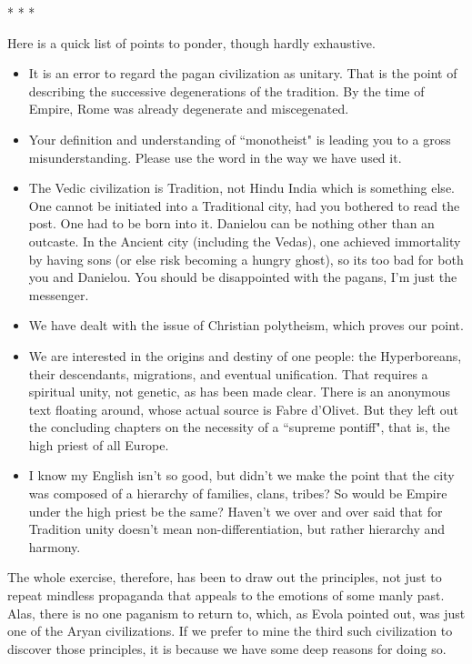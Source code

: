 \begin{center}* * *\end{center}

\begin{footnotesize}\begin{sffamily}



Here is a quick list of points to ponder, though hardly exhaustive.

\begin{itemize}
\item It is an error to regard the pagan civilization as unitary. That is the point of describing the successive degenerations of the tradition. By the time of Empire, Rome was already degenerate and miscegenated. 
\item Your definition and understanding of ``monotheist" is leading you to a gross misunderstanding. Please use the word in the way we have used it. 
\item The Vedic civilization is Tradition, not Hindu India which is something else. One cannot be initiated into a Traditional city, had you bothered to read the post. One had to be born into it. Danielou can be nothing other than an outcaste. In the Ancient city (including the Vedas), one achieved immortality by having sons (or else risk becoming a hungry ghost), so its too bad for both you and Danielou. You should be disappointed with the pagans, I'm just the messenger. 
\item We have dealt with the issue of Christian polytheism, which proves our point. 
\item We are interested in the origins and destiny of one people: the Hyperboreans, their descendants, migrations, and eventual unification. That requires a spiritual unity, not genetic, as has been made clear. There is an anonymous text floating around, whose actual source is Fabre d'Olivet. But they left out the concluding chapters on the necessity of a ``supreme pontiff", that is, the high priest of all Europe. 
\item I know my English isn't so good, but didn't we make the point that the city was composed of a hierarchy of families, clans, tribes? So would be Empire under the high priest be the same? Haven't we over and over said that for Tradition unity doesn't mean non-differentiation, but rather hierarchy and harmony. 
\end{itemize}
The whole exercise, therefore, has been to draw out the principles, not just to repeat mindless propaganda that appeals to the emotions of some manly past. Alas, there is no one paganism to return to, which, as Evola pointed out, was just one of the Aryan civilizations. If we prefer to mine the third such civilization to discover those principles, it is because we have some deep reasons for doing so.



\end{sffamily}
\end{footnotesize}
